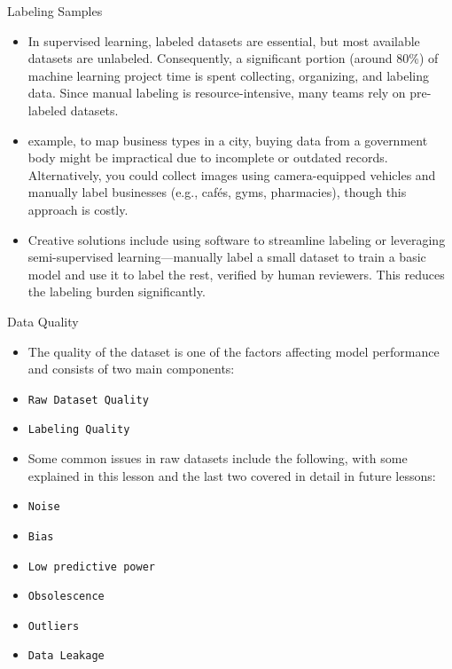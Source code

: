 \documentclass[serif, aspectratio=169]{beamer}
\begin{document}
\begin{frame}{Labeling Samples}
    \begin{itemize}
        \item In supervised learning, labeled datasets are essential, but most available datasets are unlabeled. Consequently, a significant portion (around 80\%) of machine learning project time is spent collecting, organizing, and labeling data. Since manual labeling is resource-intensive, many teams rely on pre-labeled datasets.

        \item  example, to map business types in a city, buying data from a government body might be impractical due to incomplete or outdated records. Alternatively, you could collect images using camera-equipped vehicles and manually label businesses (e.g., cafés, gyms, pharmacies), though this approach is costly.

        \item Creative solutions include using software to streamline labeling or leveraging semi-supervised learning—manually label a small dataset to train a basic model and use it to label the rest, verified by human reviewers. This reduces the labeling burden significantly.

    \end{itemize}
\end{frame}


\begin{frame}{Data Quality}
    \begin{itemize}
        \item The quality of the dataset is one of the factors affecting model performance and consists of two main components:
        \item \texttt{\color{red}Raw Dataset Quality}
        \item \texttt{\color{red}Labeling Quality}
    \end{itemize}
\end{frame}

\begin{frame}
    \begin{itemize}
        \item Some common issues in raw datasets include the following, with some explained in this lesson and the last two covered in detail in future lessons:
        \item \texttt{\color{red}Noise}
        \item \texttt{\color{red}Bias}
        \item \texttt{\color{red}Low predictive power}
        \item \texttt{\color{red}Obsolescence}
        \item \texttt{\color{red}Outliers}
        \item \texttt{\color{red}Data Leakage}
    \end{itemize}
\end{frame}
\end{document}
